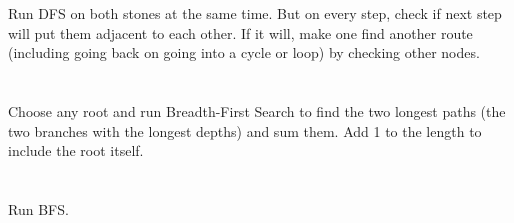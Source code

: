 \documentclass[11pt,letterpaper]{article}
\begin{document}
	\section{}
		Run DFS on both stones at the same time. But on every step, check if next step will put them adjacent to each other. If it will, make one find another route (including going back on going into a cycle or loop) by checking other nodes.
	
	\section{}
		Choose any root and run Breadth-First Search to find the two longest paths (the two branches with the longest depths) and sum them. Add 1 to the length to include the root itself.
		
	\section{}
		Run BFS.
	
\end{document}
